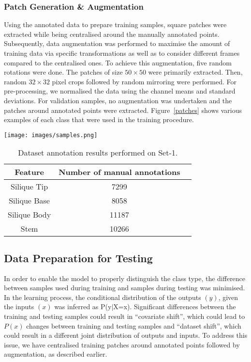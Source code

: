 \documentclass[a4paper,num-refs]{oup-contemporary}
\begin{document}
\subsubsection{Patch Generation \& Augmentation}
Using the annotated data to prepare training samples, square patches were extracted while being centralised around the manually annotated points. Subsequently, data augmentation \cite{zhang2016understanding, hamidinekoo2017investigating} was performed   to maximise  the amount of training data via specific transformations as well as to consider different frames compared to the centralised ones. To achieve this augmentation, five random rotations were done. The patches of size $50\times50$ were primarily extracted. Then, random $32\times32$ pixel crops followed by random mirroring were performed. For pre-processing, we normalised the data using the channel means and standard deviations.
For validation samples, no augmentation was undertaken and the patches around annotated points were extracted. 
Figure~\ref{patches} shows various examples of each class that were used in the training procedure. 
\begin{figure*}[!ht]
\centering
\texttt{[image: images/samples.png]}
\caption{Example extracted patches using annotations. From top to bottom: samples of base, body, stem and tip, respectively.}
\label{patches}
\end{figure*}  
\begin{table}
\centering
    \caption{Dataset annotation results performed on Set-1.}
    \begin{tabular}{c c c }
        \hline
        Feature & Number of manual annotations \\ [0.5ex] 
        \hline
        Silique Tip & 7299 \\ 
        Silique Base & 8058 \\
        Silique Body & 11187 \\
        Stem  & 10266 \\ 
        \hline
    \end{tabular}
    \label{stats}
\end{table}

\subsection{Data Preparation for Testing}
In order to enable the model to  properly distinguish the class type, the difference between samples used during training and samples during testing was minimised. In the learning process, the conditional distribution of the outputs $(y)$, given the inputs $(x)$ was inferred as P(y$|$X=x). Significant differences between the training and testing samples could result in ``covariate shift'', which could lead to $P(x)$ changes between training and testing samples and ``dataset shift'', which could result in a different joint distribution of outputs and inputs. To address this issue, we have centralised training patches around annotated points followed by augmentation, as described earlier. 
\end{document}
